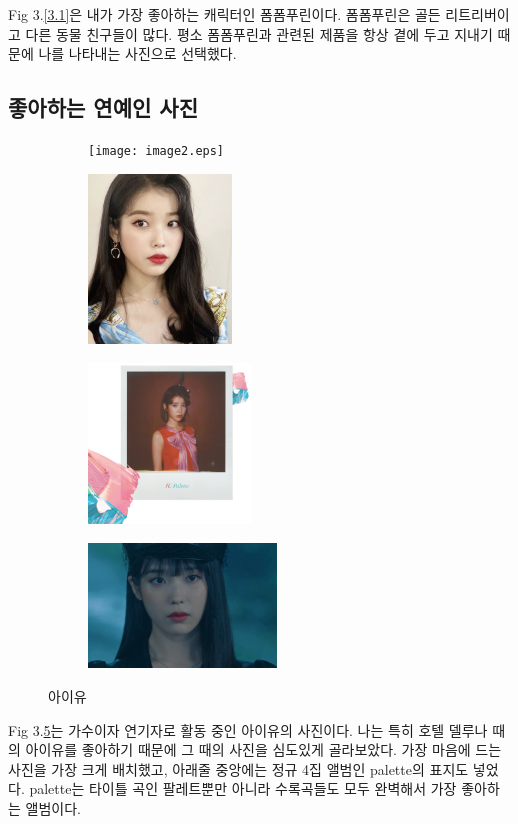 \documentclass{article}
\begin{document}
Fig 3.\ref{3.1}은 내가 가장 좋아하는 캐릭터인 폼폼푸린이다. 폼폼푸린은 골든 리트리버이고 다른 동물 친구들이 많다. 평소 폼폼푸린과 관련된 제품을 항상 곁에 두고 지내기 때문에 나를 나타내는 사진으로 선택했다.

\subsection{좋아하는 연예인 사진}
\begin{figure}[h]
    \centering
    \begin{subfigure}
        \centering
        \texttt{[image: image2.eps]}  
        \label{sub-first}
    \end{subfigure}
    \begin{subfigure}
        \centering
        \includegraphics[width=3.8cm]{image3}  
        \label{sub-second}
    \end{subfigure}
    \begin{subfigure}
        \centering
        \includegraphics[width=4.3cm]{image5}  
        \label{sub-third}
    \end{subfigure}
    \begin{subfigure}
        \centering
        \includegraphics[width=5cm]{image4}  
        \label{sub-fourth}
    \end{subfigure}
    \caption{아이유}
    \label{3.2}
\end{figure}

Fig 3.\ref{3.2}는 가수이자 연기자로 활동 중인 아이유의 사진이다. 나는 특히 호텔 델루나 때의 아이유를 좋아하기 때문에 그 때의 사진을 심도있게 골라보았다. 가장 마음에 드는 사진을 가장 크게 배치했고, 아래줄 중앙에는 정규 4집 앨범인 palette의 표지도 넣었다. palette는 타이틀 곡인 팔레트뿐만 아니라 수록곡들도 모두 완벽해서 가장 좋아하는 앨범이다.
\end{document}
